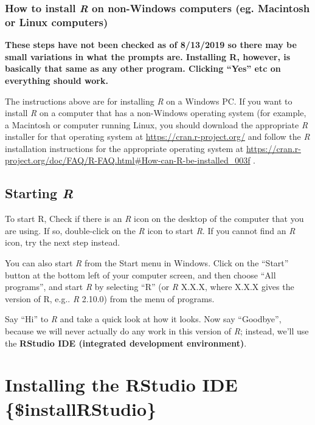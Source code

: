\documentclass[
]{book}
\begin{document}
\hypertarget{how-to-install-r-on-non-windows-computers-eg.-macintosh-or-linux-computers}{%
\subsection{\texorpdfstring{How to install \emph{R} on non-Windows computers (eg. Macintosh or Linux computers)}{How to install R on non-Windows computers (eg. Macintosh or Linux computers)}}\label{how-to-install-r-on-non-windows-computers-eg.-macintosh-or-linux-computers}}

\textbf{These steps have not been checked as of 8/13/2019 so there may be small variations in what the prompts are. Installing R, however, is basically that same as any other program. Clicking ``Yes'' etc on everything should work.}

The instructions above are for installing \emph{R} on a Windows PC. If you want to install \emph{R} on a computer that has a non-Windows operating system (for example, a Macintosh or computer running Linux, you should download the appropriate \emph{R} installer for that operating system at \url{https://cran.r-project.org/} and follow the \emph{R} installation instructions for the appropriate operating system at \url{https://cran.r-project.org/doc/FAQ/R-FAQ.html\#How-can-R-be-installed_003f} .

\hypertarget{starting-r}{%
\section{\texorpdfstring{Starting \emph{R}}{Starting R}}\label{starting-r}}

To start R, Check if there is an \emph{R} icon on the desktop of the computer that you are using. If so, double-click on the \emph{R} icon to start \emph{R}. If you cannot find an \emph{R} icon, try the next step instead.

You can also start \emph{R} from the Start menu in Windows. Click on the ``Start'' button at the bottom left of your computer screen, and then choose ``All programs'', and start \emph{R} by selecting ``R'' (or \emph{R} X.X.X, where X.X.X gives the version of R, e.g.. \emph{R} 2.10.0) from the menu of programs.

Say ``Hi'' to \emph{R} and take a quick look at how it looks. Now say ``Goodbye'', because we will never actually do any work in this version of \emph{R}; instead, we'll use the \textbf{RStudio IDE (integrated development environment)}.

\hypertarget{installing-the-rstudio-ide-installrstudio}{%
\chapter{Installing the RStudio IDE \{\$installRStudio\}}\label{installing-the-rstudio-ide-installrstudio}}
\end{document}
